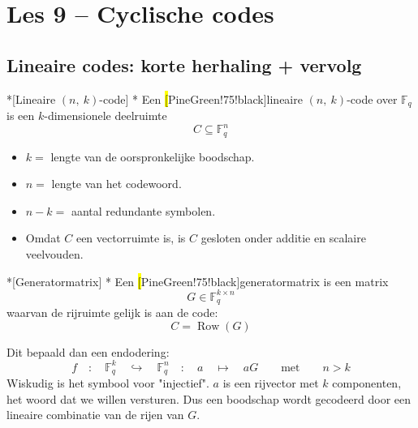 \section{Les 9 -- Cyclische codes}

\subsection{Lineaire codes: korte herhaling + vervolg}

\begin{nicedefinition}*[Lineaire $(n,\ k)$-code]
    \nextpart[]*
    Een \hl[PineGreen!75!black]{lineaire $(n,\ k)$-code} over $\mathbb{F}_q$ is een $k$-dimensionele deelruimte
    \begin{equation*}
        C \subseteq \mathbb{F}_q^n
    \end{equation*}
    \begin{itemize}
        \item $k=$ lengte van de oorspronkelijke boodschap.
        \item $n=$ lengte van het codewoord.
        \item $n-k=$ aantal redundante symbolen.
        \item Omdat $C$ een vectorruimte is, is $C$ gesloten onder additie en scalaire veelvouden.
    \end{itemize}
\end{nicedefinition}

\begin{nicedefinition}*[Generatormatrix]
    \nextpart[]*
    Een \hl[PineGreen!75!black]{generatormatrix} is een matrix
    \begin{equation*}
        G \in \mathbb{F}_q^{k \times n}
    \end{equation*}
    waarvan de rijruimte gelijk is aan de code:
    \begin{equation*}
        C = \operatorname{Row}(G)
    \end{equation*}
\end{nicedefinition}

Dit bepaald dan een endodering:
\begin{equation*}
    f \quad:\quad \mathbb{F}_q^k \quad\hookrightarrow\quad \mathbb{F}_q^n \quad:\quad a \quad\longmapsto\quad aG \qquad \text{met} \qquad n > k
\end{equation*}
Wiskudig is  het symbool voor "injectief". $a$ is een rijvector met $k$ componenten, het woord dat we willen versturen. Dus een boodschap wordt gecodeerd door een lineaire combinatie van de rijen van $G$.

